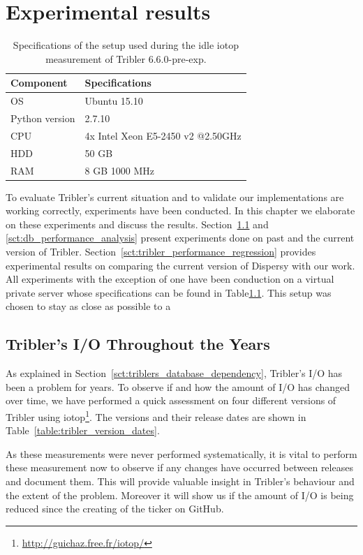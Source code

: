 \chapter{Experimental results}
\label{cpt:experiments}

\begin{table}[h]
	\centering
	\caption{Specifications of the setup used during the idle iotop measurement of Tribler 6.6.0-pre-exp.}
	\label{table:virtual_machine_specs}
	\begin{tabular}{l|l}
		\textbf{Component} 	& \textbf{Specifications} \\ \hline
		OS   				& Ubuntu 15.10 \\
		Python version		& 2.7.10 \\
		CPU					& 4x Intel Xeon E5-2450 v2 @2.50GHz \\ 
		HDD					& 50 GB  \\ 
		RAM					& 8 GB 1000 MHz  \\
	\end{tabular}
\end{table}

To evaluate Tribler's current situation and to validate our implementations are working correctly, experiments have been conducted.
In this chapter we elaborate on these experiments and discuss the results. 
Section~\ref{sct:tribler_io_past} and \ref{sct:db_performance_analysis} present experiments done on past and the current version of Tribler.
Section~\ref{sct:tribler_performance_regression} provides experimental results on comparing the current version of Dispersy with our work.
All experiments with the exception of one have been conduction on a virtual private server whose specifications can be found in Table\ref{table:virtual_machine_specs}.
This setup was chosen to stay as close as possible to a 

\section{Tribler's I/O Throughout the Years}
\label{sct:tribler_io_past}
As explained in Section~\ref{sct:triblers_database_dependency}, Tribler's I/O has been a problem for years.
To observe if and how the amount of I/O has changed over time, we have performed a quick assessment on four different versions of Tribler using iotop\footnote{\url{http://guichaz.free.fr/iotop/}}.
The versions and their release dates are shown in Table~\ref{table:tribler_version_dates}.

As these measurements were never performed systematically, it is vital to perform these measurement now to observe if any changes have occurred between releases and document them.
This will provide valuable insight in Tribler's behaviour and the extent of the problem.
Moreover it will show us if the amount of I/O is being reduced since the creating of the ticker on GitHub.

